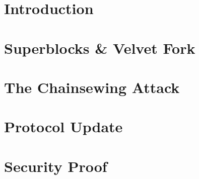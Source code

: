 \section{Introduction}


\section{Superblocks \& Velvet Fork}


\section{The Chainsewing Attack}


\section{Protocol Update}


\section{Security Proof}




\begin{acks}
\end{acks}

